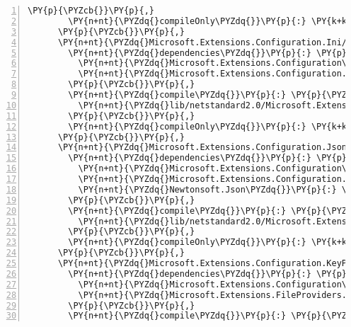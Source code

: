 \begin{Verbatim}[commandchars=\\\{\},numbers=left,firstnumber=1,stepnumber=1,numberblanklines=0]
        \PY{p}{\PYZcb{}}\PY{p}{,}
        \PY{n+nt}{\PYZdq{}compileOnly\PYZdq{}}\PY{p}{:} \PY{k+kc}{true}
      \PY{p}{\PYZcb{}}\PY{p}{,}
      \PY{n+nt}{\PYZdq{}Microsoft.Extensions.Configuration.Ini/2.1.0\PYZhy{}rc1\PYZhy{}final\PYZdq{}}\PY{p}{:} \PY{p}{\PYZob{}}
        \PY{n+nt}{\PYZdq{}dependencies\PYZdq{}}\PY{p}{:} \PY{p}{\PYZob{}}
          \PY{n+nt}{\PYZdq{}Microsoft.Extensions.Configuration\PYZdq{}}\PY{p}{:} \PY{l+s+s2}{\PYZdq{}2.1.0\PYZhy{}rc1\PYZhy{}final\PYZdq{}}\PY{p}{,}
          \PY{n+nt}{\PYZdq{}Microsoft.Extensions.Configuration.FileExtensions\PYZdq{}}\PY{p}{:} \PY{l+s+s2}{\PYZdq{}2.1.0\PYZhy{}rc1\PYZhy{}final\PYZdq{}}
        \PY{p}{\PYZcb{}}\PY{p}{,}
        \PY{n+nt}{\PYZdq{}compile\PYZdq{}}\PY{p}{:} \PY{p}{\PYZob{}}
          \PY{n+nt}{\PYZdq{}lib/netstandard2.0/Microsoft.Extensions.Configuration.Ini.dll\PYZdq{}}\PY{p}{:} \PY{p}{\PYZob{}}\PY{p}{\PYZcb{}}
        \PY{p}{\PYZcb{}}\PY{p}{,}
        \PY{n+nt}{\PYZdq{}compileOnly\PYZdq{}}\PY{p}{:} \PY{k+kc}{true}
      \PY{p}{\PYZcb{}}\PY{p}{,}
      \PY{n+nt}{\PYZdq{}Microsoft.Extensions.Configuration.Json/2.1.0\PYZhy{}rc1\PYZhy{}final\PYZdq{}}\PY{p}{:} \PY{p}{\PYZob{}}
        \PY{n+nt}{\PYZdq{}dependencies\PYZdq{}}\PY{p}{:} \PY{p}{\PYZob{}}
          \PY{n+nt}{\PYZdq{}Microsoft.Extensions.Configuration\PYZdq{}}\PY{p}{:} \PY{l+s+s2}{\PYZdq{}2.1.0\PYZhy{}rc1\PYZhy{}final\PYZdq{}}\PY{p}{,}
          \PY{n+nt}{\PYZdq{}Microsoft.Extensions.Configuration.FileExtensions\PYZdq{}}\PY{p}{:} \PY{l+s+s2}{\PYZdq{}2.1.0\PYZhy{}rc1\PYZhy{}final\PYZdq{}}\PY{p}{,}
          \PY{n+nt}{\PYZdq{}Newtonsoft.Json\PYZdq{}}\PY{p}{:} \PY{l+s+s2}{\PYZdq{}11.0.2\PYZdq{}}
        \PY{p}{\PYZcb{}}\PY{p}{,}
        \PY{n+nt}{\PYZdq{}compile\PYZdq{}}\PY{p}{:} \PY{p}{\PYZob{}}
          \PY{n+nt}{\PYZdq{}lib/netstandard2.0/Microsoft.Extensions.Configuration.Json.dll\PYZdq{}}\PY{p}{:} \PY{p}{\PYZob{}}\PY{p}{\PYZcb{}}
        \PY{p}{\PYZcb{}}\PY{p}{,}
        \PY{n+nt}{\PYZdq{}compileOnly\PYZdq{}}\PY{p}{:} \PY{k+kc}{true}
      \PY{p}{\PYZcb{}}\PY{p}{,}
      \PY{n+nt}{\PYZdq{}Microsoft.Extensions.Configuration.KeyPerFile/2.1.0\PYZhy{}rc1\PYZhy{}final\PYZdq{}}\PY{p}{:} \PY{p}{\PYZob{}}
        \PY{n+nt}{\PYZdq{}dependencies\PYZdq{}}\PY{p}{:} \PY{p}{\PYZob{}}
          \PY{n+nt}{\PYZdq{}Microsoft.Extensions.Configuration\PYZdq{}}\PY{p}{:} \PY{l+s+s2}{\PYZdq{}2.1.0\PYZhy{}rc1\PYZhy{}final\PYZdq{}}\PY{p}{,}
          \PY{n+nt}{\PYZdq{}Microsoft.Extensions.FileProviders.Physical\PYZdq{}}\PY{p}{:} \PY{l+s+s2}{\PYZdq{}2.1.0\PYZhy{}rc1\PYZhy{}final\PYZdq{}}
        \PY{p}{\PYZcb{}}\PY{p}{,}
        \PY{n+nt}{\PYZdq{}compile\PYZdq{}}\PY{p}{:} \PY{p}{\PYZob{}}

\end{Verbatim}
